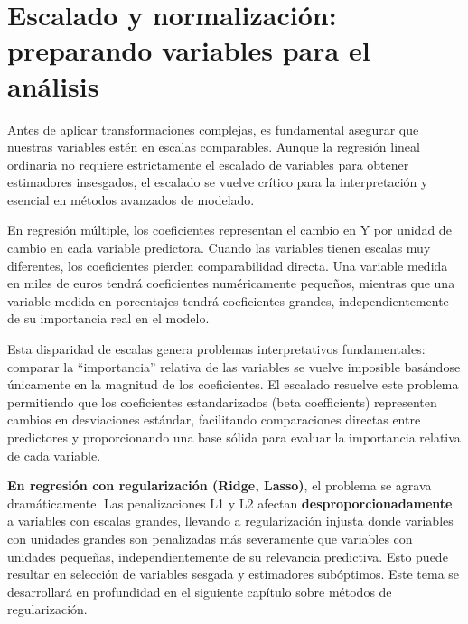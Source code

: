 \documentclass[
  letterpaper,
  DIV=11,
  numbers=noendperiod]{scrreprt}
\begin{document}
\section{Escalado y normalización: preparando variables para el
análisis}\label{escalado-y-normalizaciuxf3n-preparando-variables-para-el-anuxe1lisis}

Antes de aplicar transformaciones complejas, es fundamental asegurar que
nuestras variables estén en escalas comparables. Aunque la regresión
lineal ordinaria no requiere estrictamente el escalado de variables para
obtener estimadores insesgados, el escalado se vuelve crítico para la
interpretación y esencial en métodos avanzados de modelado.

En regresión múltiple, los coeficientes representan el cambio en Y por
unidad de cambio en cada variable predictora. Cuando las variables
tienen escalas muy diferentes, los coeficientes pierden comparabilidad
directa. Una variable medida en miles de euros tendrá coeficientes
numéricamente pequeños, mientras que una variable medida en porcentajes
tendrá coeficientes grandes, independientemente de su importancia real
en el modelo.

Esta disparidad de escalas genera problemas interpretativos
fundamentales: comparar la ``importancia'' relativa de las variables se
vuelve imposible basándose únicamente en la magnitud de los
coeficientes. El escalado resuelve este problema permitiendo que los
coeficientes estandarizados (beta coefficients) representen cambios en
desviaciones estándar, facilitando comparaciones directas entre
predictores y proporcionando una base sólida para evaluar la importancia
relativa de cada variable.

\begin{tcolorbox}[enhanced jigsaw, leftrule=.75mm, breakable, colbacktitle=quarto-callout-note-color!10!white, bottomrule=.15mm, colframe=quarto-callout-note-color-frame, toprule=.15mm, colback=white, coltitle=black, bottomtitle=1mm, left=2mm, title=\textcolor{quarto-callout-note-color}{\faInfo}\hspace{0.5em}{Escalado en métodos de regularización}, opacityback=0, arc=.35mm, opacitybacktitle=0.6, toptitle=1mm, titlerule=0mm, rightrule=.15mm]

\textbf{En regresión con regularización (Ridge, Lasso)}, el problema se
agrava dramáticamente. Las penalizaciones L1 y L2 afectan
\textbf{desproporcionadamente} a variables con escalas grandes, llevando
a regularización injusta donde variables con unidades grandes son
penalizadas más severamente que variables con unidades pequeñas,
independientemente de su relevancia predictiva. Esto puede resultar en
selección de variables sesgada y estimadores subóptimos. Este tema se
desarrollará en profundidad en el siguiente capítulo sobre métodos de
regularización.

\end{tcolorbox}
\end{document}

